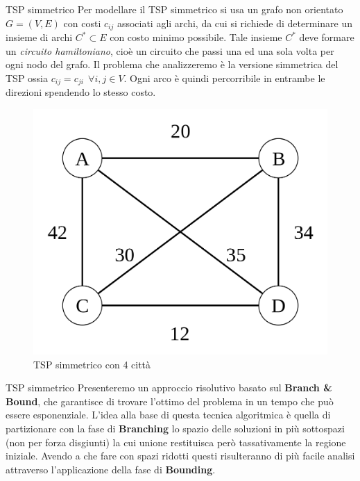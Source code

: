 \documentclass[10pt]{beamer}
\begin{document}
\begin{frame}{TSP simmetrico}
    Per modellare il TSP simmetrico si usa un grafo non orientato $G=(V,E)$ con costi $c_{ij}$ associati agli archi, da cui si richiede di determinare un insieme di archi $C^* \subset E$ con costo minimo possibile. Tale insieme $C^*$ deve formare un \textit{circuito hamiltoniano}, cioè un circuito che passi una ed una sola volta per ogni nodo del grafo. Il problema che analizzeremo è la versione simmetrica del TSP ossia $c_{ij} = c_{ji} \:\: \forall i,j \in V$. Ogni arco è quindi percorribile in entrambe le direzioni spendendo lo stesso costo.
    \begin{figure}
        \centering
        \includegraphics[scale=0.11]{files/SimmetricTSP.png}
        \caption{TSP simmetrico con 4 città}
    \end{figure}
\end{frame}

\begin{frame}{TSP simmetrico}
    Presenteremo un approccio risolutivo basato sul \textbf{Branch \& Bound}, che garantisce di trovare l'ottimo del problema in un tempo che può essere esponenziale. L'idea alla base di questa tecnica algoritmica è quella di partizionare con la fase di \textbf{Branching} lo spazio delle soluzioni in più sottospazi (non per forza disgiunti) la cui unione restituisca però tassativamente la regione iniziale. Avendo a che fare con spazi ridotti questi risulteranno di più facile analisi attraverso l'applicazione della fase di \textbf{Bounding}.
\end{frame}
\end{document}
